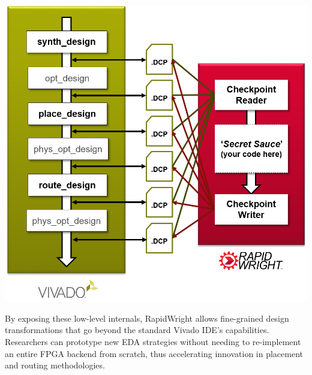 {
    \centering
    \includegraphics[width=0.8\columnwidth]{figures/vivado_dcps.png}
    \label{fig:vivado_dcps}
}

By exposing these low-level internals, RapidWright allows fine-grained design transformations that go beyond the standard Vivado IDE’s capabilities. 
Researchers can prototype new EDA strategies without needing to re-implement an entire FPGA backend from scratch, thus accelerating innovation in placement and routing methodologies.

